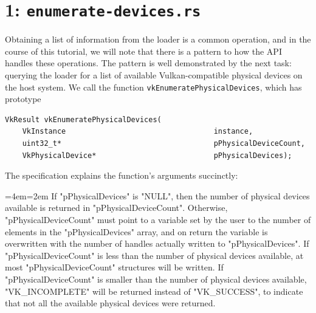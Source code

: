 \documentclass[12pt,letterpaper]{article}
\newcommand{\cil}[1]{\texttt{#1}}
\newenvironment{indenttext}{%
	\par%
	\medskip
	\leftskip=4em\rightskip=2em%
	\noindent\ignorespaces}{%
	\par\medskip}
\renewenvironment{quotation}{\begin{indenttext}\fontfamily{LinuxLibertineT-OsF}\selectfont}{\end{indenttext}}
\begin{document}
\section{1: \texttt{enumerate-devices.rs}}
	Obtaining a list of information from the loader is a common operation, and in the course of this tutorial, we will note that there is a pattern to how the API handles these operations. The pattern is well demonstrated by the next task: querying the loader for a list of available Vulkan-compatible physical devices on the host system. We call the function \cil{vkEnumeratePhysicalDevices}, which has prototype
	\begin{verbatim}
VkResult vkEnumeratePhysicalDevices(
	VkInstance                                  instance,
	uint32_t*                                   pPhysicalDeviceCount,
	VkPhysicalDevice*                           pPhysicalDevices);
	\end{verbatim}
    
    The specification explains the function's arguments succinctly:
        \begin{quotation}
            If "pPhysicalDevices" is "NULL", then the number of physical devices available is returned in "pPhysicalDeviceCount". Otherwise, "pPhysicalDeviceCount" must point to a variable set by the user to the number of elements in the "pPhysicalDevices" array, and on return the variable is overwritten with the number of handles actually written to "pPhysicalDevices". If "pPhysicalDeviceCount" is less than the number of physical devices available, at most "pPhysicalDeviceCount" structures will be written. If "pPhysicalDeviceCount" is smaller than the number of physical devices available, "VK_INCOMPLETE" will be returned instead of "VK_SUCCESS", to indicate that not all the available physical devices were returned.
        \end{quotation}
    
\end{document}
